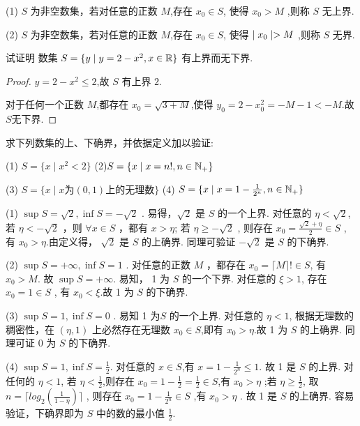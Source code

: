\begin{solve}
    \hspace{0.5em}(1) $S$ 为非空数集，若对任意的正数 $M$,存在 $x_0\in S$, 使得 $x_0 > M$ ,则称 $S$ 无上界.

    (2) $S$ 为非空数集，若对任意的正数 $M$,存在 $x_0\in S$, 使得 $\mid x_0 \mid > M$ ,则称 $S$ 无界.
\end{solve}

\begin{practice}
    试证明 数集 $S=\{y\mid y=2-x^2,x\in \mathbb{R}\}$ 有上界而无下界.
\end{practice}

\begin{proof}
    $y=2-x^2\le 2$,故 $S$ 有上界 $2$.

     对于任何一个正数 $M$,都存在 $x_0=\sqrt{3+M}$,使得 $y_0=2-x_0^2=-M-1<-M$.故 $S$无下界.
\end{proof}

\begin{practice}
    求下列数集的上、下确界，并依据定义加以验证:

    (1) $S=\{x\mid x^2<2\}$ \qquad (2)$S=\{x \mid x=n! ,n\in \mathbb{N}_+ \}$

    (3) $S=\{ x\mid x\mbox{为} (0,1) \mbox{上的无理数} \}$ \qquad (4) $S=\{ x \mid x=1-\frac{1}{2^n},n\in \mathbb{N}_+\}$
\end{practice}

\begin{solve}
    (1) $\sup S = \sqrt{2},\inf S = -\sqrt{2}$ . 
    易得，$\sqrt{2}$ 是 $S$ 的一个上界. 对任意的 $\eta<\sqrt{2}$, 若 $\eta<-\sqrt{2}$ ，则 $\forall x\in S$ ，都有 $x>\eta $; 若 $\eta \ge -\sqrt{2}$ , 则存在 $x_0 = \frac{\sqrt{2}+\eta}{2} \in S$ , 有 $x_0>\eta $.由定义得， $\sqrt{2}$ 是 $S$ 的上确界. 同理可验证 $-\sqrt{2}$ 是 $S$ 的下确界.

    (2) $\sup S = +\infty,\inf S = 1$ . 对任意的正数 $M$ ，都存在 $x_0 = \lceil M \rceil ! \in S$, 有 $x_0>M$. 故 $\sup S = +\infty$. 易知， 1 为 $S$ 的一个下界. 对任意的 $ \xi> 1$, 存在 $x_0=1\in S$ , 有 $x_0<\xi$.故 1 为 $S$ 的下确界.

    (3) $\sup S = 1,\inf S = 0$  . 易知 1 为$S$ 的一个上界. 对任意的 $\eta < 1$, 根据无理数的稠密性，在 $(\eta,1)$ 上必然存在无理数 $x_0\in S$,即有 $x_0>\eta$.故 1 为 $S$ 的上确界. 同理可证 $0$ 为 $S$ 的下确界.

    (4) $\sup S = 1,\inf S = \frac{1}{2}$. 对任意的 $x\in S$,有 $x=1-\frac{1}{2^n}\le 1$. 故 1 是 $S$ 的上界. 对任何的 $\eta <1$, 若 $\eta<\frac{1}{2}$,则存在 $x_0=1-\frac{1}{2}=\frac{1}{2} \in S$,有 $x_0>\eta$ ;若 $\eta\ge \frac{1}{2}$, 取 $n=\lceil log_2(\frac{1}{1 - \eta}) \rceil$ , 则存在 $x_0 = 1-\frac{1}{2^n} \in S$ ,有 $x_0>\eta$ . 故 1 是 $S$ 的上确界. 容易验证，下确界即为 $S$ 中的数的最小值 $\frac{1}{2}$.
\end{solve}

